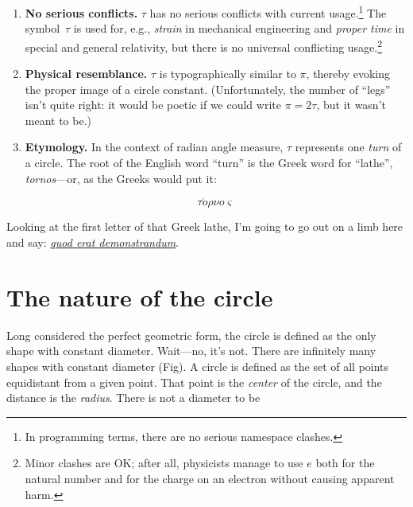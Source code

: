 \documentclass{article}
\begin{document}
\begin{enumerate}
  \item \textbf{No serious conflicts.} $\tau$ has no serious conflicts with current usage.\footnote{In programming terms, there are no serious namespace clashes.} The symbol~$\tau$ is used for, e.g., \emph{strain} in mechanical engineering and \emph{proper time} in special and general relativity, but there is no universal conflicting usage.\footnote{Minor clashes are OK; after all, physicists manage to use $e$ both for the natural number and for the charge on an electron without causing apparent harm.} 
  
  \item \textbf{Physical resemblance.} $\tau$ is typographically similar to $\pi$, thereby evoking the proper image of a circle constant. (Unfortunately, the number of ``legs'' isn't quite right: it would be poetic if we could write $\pi = 2\tau$, but it wasn't meant to be.)
  
  \item \textbf{Etymology.} In the context of radian angle measure, $\tau$ represents one \emph{turn} of a circle. The root of the English word ``turn'' is the Greek word for ``lathe'', \emph{tornos}---or, as the Greeks would put it: 
  
\[ \tau \acute{o}\rho\nu o\varsigma \]
  
\end{enumerate}

Looking at the first letter of that Greek lathe, I'm going to go out on a limb here and say: \href{http://en.wikipedia.org/wiki/Q.E.D.}{\emph{quod erat demonstrandum}}.


\section{The nature of the circle} %
\label{sec:the_nature_of_the_circle}

Long considered the perfect geometric form, the circle is defined as the only shape with constant diameter. Wait---no, it's not. There are infinitely many shapes with constant diameter (Fig). A circle is defined as the set of all points equidistant from a given point. That point is the \emph{center} of the circle, and the distance is the \emph{radius}. There is not a diameter to be

\end{document}
